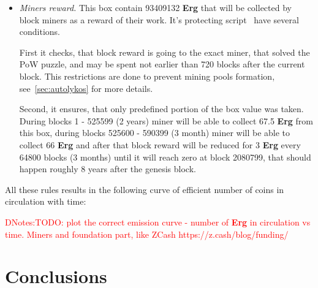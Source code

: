 \documentclass[]{article}
\newcommand{\dnote}[1]{{\textcolor{red}{DNotes:{#1}}}}
\newcommand{\Erg}{\textbf{Erg}}
\begin{document}
\begin{itemize}
        \item{\em Miners reward.} This box contain 93409132 \Erg{} that will be collected by block miners
        as a reward of their work.
        It's protecting script~\cite{link to corresponding ergo tree} have several conditions.

        First it checks, that block reward is going to the exact miner, that solved the PoW puzzle, and
        may be spent not earlier than 720 blocks after the current block.
        This restrictions are done to prevent mining pools formation, see~\ref{sec:autolykos} for more details.

        Second, it ensures, that only predefined portion of the box value was taken.
        During blocks 1 - 525599 (2 years) miner will be able to collect 67.5 \Erg{} from this box,
        during blocks 525600 - 590399 (3 month) miner will be able to collect 66 \Erg{} and after
        that block reward will be reduced for 3 \Erg{} every 64800 blocks (3 months) until it will reach zero
        at block 2080799, that should happen roughly 8 years after the genesis block.


    \end{itemize}

    All these rules results in the following curve of efficient number of coins in circulation with time:

    \dnote{TODO: plot the correct emission curve - number of \Erg{} in circulation vs time. Miners and foundation part, like ZCash https://z.cash/blog/funding/}

    

    \section{Conclusions}

    
\end{document}
